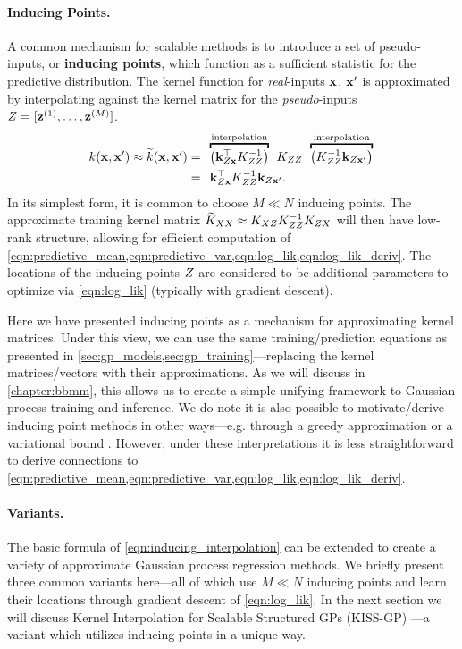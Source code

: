 \paragraph{Inducing Points.}
A common mechanism for scalable methods is to introduce a set of pseudo-inputs, or {\bf inducing points}, which function as a sufficient statistic for the predictive distribution.
The kernel function for \emph{real}-inputs $\mathbf{x}$, $\mathbf{x}'$ is approximated by interpolating against the kernel matrix for the \emph{pseudo}-inputs $Z = [\mathbf{z}^{(1)}, \ldots, \mathbf{z}^{(M)}]$.
%
\begin{align}
  k(\bx, \bx') \approx \widetilde k(\bx, \bx') &= \:\:
		\overbracket{ \left( \bk_{\bZ\bx}^\top \bK_{\bZ\bZ}^{-1} \right) }^{\text{interpolation}} \:\: \bK_{\bZ\bZ} \:\:
		\overbracket{ \left( \bK_{\bZ\bZ}^{-1} \bk_{\bZ\bx'} 		 \right) }^{\text{interpolation}}
	\nonumber{} \\
	&= \:\:
	\bk_{\bZ\bx}^\top \bK_{\bZ\bZ}^{-1} \bk_{\bZ\bx'}.
	\label{eqn:inducing_interpolation}
\end{align}
%
In its simplest form, it is common to choose $M \ll N$ inducing points.
The approximate training kernel matrix $\widetilde {K}_{XX} \approx K_{XZ} K_{ZZ}^{-1} K_{ZX}$ will then have low-rank structure, allowing for efficient computation of \cref{eqn:predictive_mean,eqn:predictive_var,eqn:log_lik,eqn:log_lik_deriv}.
The locations of the inducing points $Z$ are considered to be additional parameters to optimize via \cref{eqn:log_lik} (typically with gradient descent).

Here we have presented inducing points as a mechanism for approximating kernel matrices.
Under this view, we can use the same training/prediction equations as presented in \cref{sec:gp_models,sec:gp_training}---replacing the kernel matrices/vectors with their approximations.
As we will discuss in \cref{chapter:bbmm}, this allows us to create a simple unifying framework to Gaussian process training and inference.
We do note it is also possible to motivate/derive inducing point methods in other ways---e.g. through a greedy approximation \cite{smola2001sparse} or a variational bound \cite{titsias2009variational,hensman2013gaussian}.
However, under these interpretations it is less straightforward to derive connections to \cref{eqn:predictive_mean,eqn:predictive_var,eqn:log_lik,eqn:log_lik_deriv}.

\paragraph{Variants.}
The basic formula of \cref{eqn:inducing_interpolation} can be extended to create a variety of approximate Gaussian process regression methods.
We briefly present three common variants here---all of which use $M \ll N$ inducing points and learn their locations through gradient descent of \cref{eqn:log_lik}.
In the next section we will discuss Kernel Interpolation for Scalable Structured GPs (KISS-GP) \cite{wilson2015kernel}---a variant which utilizes inducing points in a unique way.

